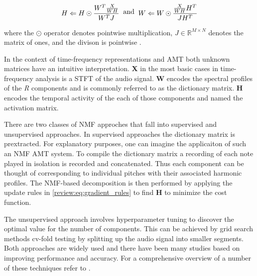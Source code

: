 \begin{equation}
  \begin{split}
    H \Leftarrow H \odot \frac{W^{T}\frac{X}{WH}}{W^{T}J}
  \end{split}
  \text{\;\;and\;\;}
  \begin{split}
    W \Leftarrow W \odot \frac{\frac{X}{WH}H^{T}}{JH^{T}}
  \end{split}
  \label{review:eq:gradient_rules}
\end{equation}

where the $\odot$ operator denotes pointwise multiplication, $J \in
  \mathbb{R}^{M \times N}$ denotes the matrix of ones, and the divison is
pointwise \cite{amt2019:Benetos}.

In the context of time-frequency representations and \ac{AMT} both unknown matrices
have an intuitive interpretation. \textbf{X} in the most basic cases in
time-frequency analysis is a \ac{STFT} of the audio signal. \textbf{W} encodes the
spectral profiles of the \emph{R} components and is commonly referred to as the
dictionary matrix. \textbf{H} encodes the temporal activity of the each of those
components and named the activation matrix.

There are two classes of \ac{NMF} approches that fall into supervised and
unsupervised approaches. In supervised approaches the dictionary matrix is
prextracted. For explanatory purposes, one can imagine the applicaiton of such
an \ac{NMF} \ac{AMT} system. To compile the dictionary matrix a recording of each note
played in isolation is recorded and concatenated. Thus each component can be
thought of corresponding to individual pitches with their associated harmonic
profiles. The \ac{NMF}-based decomposition is then performed by applying the update
rules in \autoref{review:eq:gradient_rules} to find \textbf{H} to minimize the
cost function.

The unsupervised approach involves hyperparameter tuning to discover the optimal
value for the number of components. This can be achieved by grid search methods
cv-fold testing by splitting up the audio signal into smaller segments. Both
approaches are widely used and there have been many studies based on improving
performance and accuracy. For a comprehensive overview of a number of these
techniques refer to \cite{f0estimation2006:Cheveigne,Christensen:2009,
  spmmt:Klapuri}.

